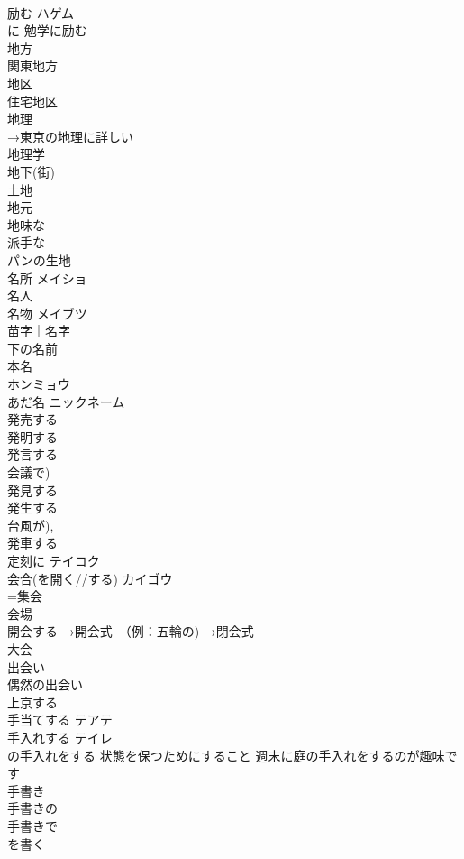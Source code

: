 \documentclass[8pt]{extreport}
\begin{document}
\begin{CJK}{UTF8}{min}
\\	励む	ハゲム 
\\	に 勉学に励む
\\	地方	
\\	関東地方 
\\	地区	
\\	住宅地区 
\\	地理	
\\	→東京の地理に詳しい 
\\	地理学 
\\	地下(街)	
\\	土地	
\\	地元	
\\	地味な　
\\	派手な	
\\	パンの生地	
\\	名所	メイショ 
\\	名人	
\\	名物	メイブツ 
\\	苗字｜名字	
\\	下の名前 
\\	本名	
\\	ホンミョウ
\\	あだ名	ニックネーム
\\	発売する	
\\	発明する	
\\	発言する	
\\	会議で)
\\	発見する	
\\	発生する	
\\	台風が), 
\\	発車する	
\\	定刻に	テイコク 
\\	会合(を開く//する)	カイゴウ 
\\	=集会
\\	会場	
\\	開会する →開会式　（例：五輪の) →閉会式	
\\	大会	
\\	出会い	
\\	偶然の出会い 
\\	上京する	
\\	手当てする	テアテ 
\\	手入れする	テイレ 
\\	の手入れをする 状態を保つためにすること 週末に庭の手入れをするのが趣味です
\\	手書き	
\\	手書きの
\\	手書きで
\\	を書く

\end{CJK}
\end{document}
